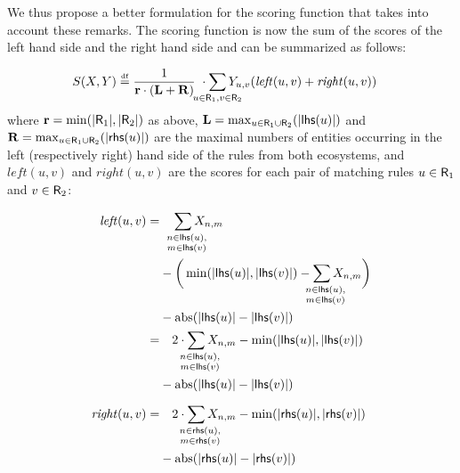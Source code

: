 \documentclass[a4paper,twoside]{article}
\begin{document}
We thus propose a better formulation for the scoring function that takes into account these remarks.
The  scoring function is now the sum of the scores of the left hand side and the right hand side and can be summarized as follows:

\begin{align*} 
  \gf(X, Y) \defeq {} 
  & \frac{1}{\rulemax \cdot (\Lhs + \Rhs) } ~\cdot \sum_{\mathclap{u \in \Ru_1, v \in \Ru_2}} Y_{u,v}  (\mathit{left}(u,v)+\mathit{right}(u,v) ) 
\end{align*}
%
where $\mathbf{r} = \min (|\mathsf{R}_1|, |\mathsf{R}_2|)$ as above, 
$\mathbf{L} =  \max_{u\in \mathsf{R}_1 \cup \mathsf{R}_2} (|\mathsf{lhs}(u)|)$ and 
$\mathbf{R} = \max_{u\in \mathsf{R}_1 \cup \mathsf{R}_2} (|\mathsf{rhs}(u)|)$ 
%
 are the maximal numbers of entities occurring in the left (respectively right) hand side of the  rules from both ecosystems, and $ \mathit{left}(u,v)$ and  $\mathit{right}(u,v) $ are the scores for each pair of matching rules $u \in \mathsf{R}_1$ and $v \in \mathsf{R}_2$:

\begin{align*} 
   \mathit{left}(u,v) =  &
    \quad  \sum_{\mathrlap{\substack{n \in \lhs{u},\\ m \in \lhs{v}}}} X_{n,m} \\
          &- \bigg(\min(|\lhs{u}|, |\lhs{v}|) - \sum_{\mathrlap{\substack{n \in \lhs{u},\\ m \in \lhs{v}}}} X_{n,m} \bigg) \\
         & - \abs(|\lhs{u}| - |\lhs{v}|)   \\ 
    = & \quad 2 \cdot \sum_{\mathrlap{\substack{n \in \lhs{u},\\ m \in \lhs{v}}}} X_{n,m} 
         -\min(|\lhs{u}|, |\lhs{v}|) \\
        &- \abs(|\lhs{u}| - |\lhs{v}|)   \\[2mm]
   \mathit{right}(u,v) = & \quad 2 \cdot \sum_{\mathrlap{\substack{n \in \rhs{u},\\ m \in \rhs{v}}}} X_{n,m}
                  - \min(|\rhs{u}|, |\rhs{v}|) \\
                 & - \abs(|\rhs{u}| - |\rhs{v}|)   
\end{align*}
\end{document}
